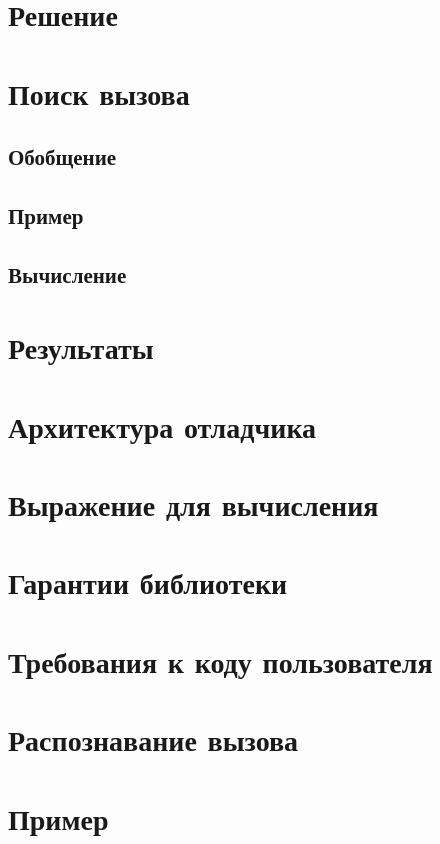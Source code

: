 \section{Решение}
\section{Поиск вызова}

\subsection{Обобщение}

\subsection{Пример}

\subsection{Вычисление}


\section{Результаты}



\appendix
\section{Архитектура отладчика}

\section{Выражение для вычисления}

\section{Гарантии библиотеки}

\section{Требования к коду пользователя}

\section{Распознавание вызова}


\section{Пример}


